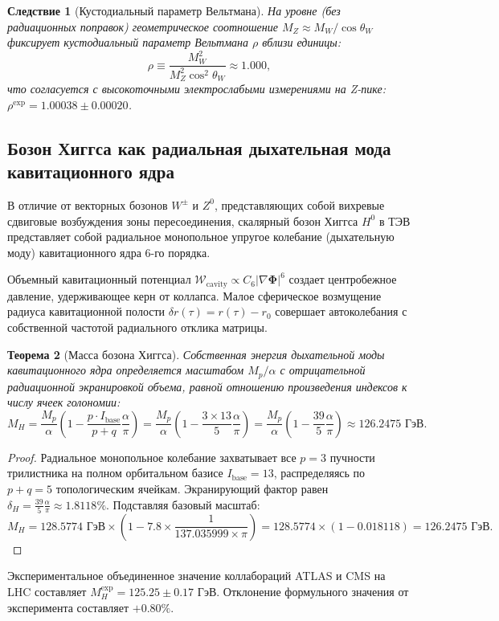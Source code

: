 \documentclass[11pt,a4paper]{article}
\newtheorem{theorem}{Теорема}[section]
\newtheorem{corollary}[theorem]{Следствие}
\theoremstyle{definition}
\theoremstyle{remark}
\begin{document}
\begin{corollary}[Кустодиальный параметр Вельтмана]
На уровне (без радиационных поправок) геометрическое соотношение $M_Z \approx M_W / \cos\theta_W$ фиксирует кустодиальный параметр Вельтмана $\rho$ вблизи единицы:
\begin{equation}
    \rho \equiv \frac{M_W^2}{M_Z^2 \cos^2\theta_W} \approx \mathbf{1.000},
    \label{eq:rho_custodial}
\end{equation}
что согласуется с высокоточными электрослабыми измерениями на Z-пике: $\rho^{\mathrm{exp}} = 1.00038 \pm 0.00020$.
\end{corollary}

\subsection{Бозон Хиггса как радиальная дыхательная мода кавитационного ядра}
В отличие от векторных бозонов $W^\pm$ и $Z^0$, представляющих собой вихревые сдвиговые возбуждения зоны пересоединения, скалярный бозон Хиггса $H^0$ в ТЭВ представляет собой радиальное монопольное упругое колебание (дыхательную моду) кавитационного ядра 6-го порядка.

Объемный кавитационный потенциал $\mathcal{W}_{\mathrm{cavity}} \propto C_6 |\nabla \boldsymbol{\Phi}|^6$ создает центробежное давление, удерживающее керн от коллапса. Малое сферическое возмущение радиуса кавитационной полости $\delta r(\tau) = r(\tau) - r_0$ совершает автоколебания с собственной частотой радиального отклика матрицы.

\begin{theorem}[Масса бозона Хиггса]
Собственная энергия дыхательной моды кавитационного ядра определяется масштабом $M_p/\alpha$ с отрицательной радиационной экранировкой объема, равной отношению произведения индексов к числу ячеек голономии:
\begin{equation}
    M_H = \frac{M_p}{\alpha} \left( 1 - \frac{p \cdot I_{\mathrm{base}}}{p+q} \frac{\alpha}{\pi} \right) = \frac{M_p}{\alpha} \left( 1 - \frac{3 \times 13}{5} \frac{\alpha}{\pi} \right) = \frac{M_p}{\alpha} \left( 1 - \frac{39}{5} \frac{\alpha}{\pi} \right) \approx \mathbf{126.2475\text{ ГэВ}}.
    \label{eq:higgs_mass_exact}
\end{equation}
\end{theorem}

\begin{proof}
Радиальное монопольное колебание захватывает все $p=3$ пучности трилистника на полном орбитальном базисе $I_{\mathrm{base}} = 13$, распределяясь по $p+q=5$ топологическим ячейкам. Экранирующий фактор равен $\delta_H = \frac{39}{5}\frac{\alpha}{\pi} \approx 1.8118\%$. Подставляя базовый масштаб:
\begin{equation}
    M_H = 128.5774\text{ ГэВ} \times \left( 1 - 7.8 \times \frac{1}{137.035999 \times \pi} \right) = 128.5774 \times (1 - 0.018118) = \mathbf{126.2475\text{ ГэВ}}.
\end{equation}
\end{proof}
Экспериментальное объединенное значение коллабораций ATLAS и CMS на LHC составляет $M_H^{\mathrm{exp}} = 125.25 \pm 0.17\text{ ГэВ}$. Отклонение формульного значения от эксперимента составляет $+0.80\%$.
\end{document}
